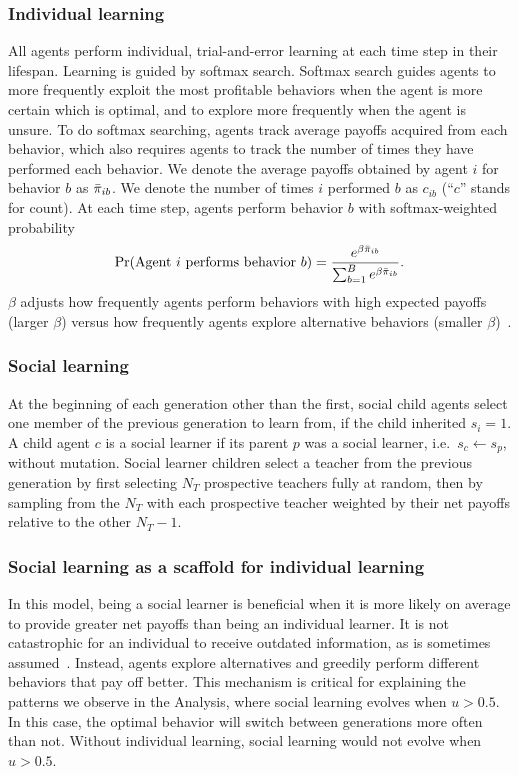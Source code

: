 \documentclass[letterpaper,11.5pt]{scrartcl}
\begin{document}
\subsubsection{Individual learning}

All agents perform individual, trial-and-error learning at each time step in
their lifespan.  Learning is guided by softmax search. Softmax search
guides agents to more frequently exploit the most profitable behaviors when the
agent is more certain which is optimal, and to explore more frequently when the
agent is unsure.  To do softmax searching, agents track average payoffs acquired
from each behavior, which also requires agents to track the number of times they
have performed each behavior.  We denote the average payoffs obtained by agent $i$
for behavior $b$ as $\bar\pi_{ib}$. We denote the number of times $i$ performed $b$
as $c_{ib}$ (``$c$'' stands for count). 
At each time step, agents perform behavior $b$ with softmax-weighted probability
\begin{equation}
  \Pr(\text{Agent $i$ performs behavior $b$}) = 
    \frac{e^{\beta \bar\pi_{ib}}}{\sum_{b=1}^B e^{\beta \bar\pi_{ib}}}.
\end{equation}
\noindent
$\beta$ adjusts how frequently agents perform 
behaviors with high expected payoffs (larger $\beta$) versus how frequently
agents explore alternative behaviors (smaller $\beta$)~\cite{McElreath2005}. 


\subsubsection{Social learning}

At the beginning of each generation other than the first, social child agents select
one member of the previous generation to learn from, if the child inherited
$s_i = 1$. A child agent $c$ is a social learner if its parent $p$ was a social
learner, i.e.\ $s_c \leftarrow s_p$, without mutation.  Social learner children
select a teacher from the previous generation by first selecting $N_T$ prospective
teachers fully at random, then by sampling from the $N_T$ with each prospective
teacher weighted by their net payoffs relative to the other $N_T - 1$.


\subsubsection{Social learning as a scaffold for individual learning}

In this model, being a social learner is beneficial when it is more likely on
average to provide greater net payoffs than being an individual learner.  It is not
catastrophic for an individual to receive outdated information, as is sometimes
assumed~\cite[e.g.]{Rogers1988}. Instead, agents explore alternatives and
greedily perform different behaviors that pay off better. 
This mechanism is critical for explaining the patterns we observe in the 
Analysis, where social learning evolves when $u > 0.5$.
In this case, the optimal behavior will switch between generations more often than
not. Without individual learning, social learning would not evolve when $u > 0.5$.
\end{document}
